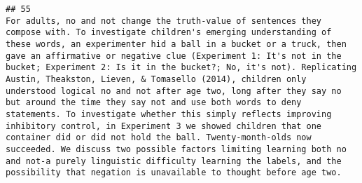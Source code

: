 \documentclass[
  english,
  man]{apa6}
\begin{document}
\begin{verbatim}
## 55                                                                                                                                                                                                                                                                                                                                                                                                                                                                                                                                                                                                                                                                                                                                                                                                                                                                                                                                                                                                                                                                                                                                                                                                                                                                                                                                                                                                                                                                                                                                                                                                                                                                                                               For adults, no and not change the truth-value of sentences they compose with. To investigate children's emerging understanding of these words, an experimenter hid a ball in a bucket or a truck, then gave an affirmative or negative clue (Experiment 1: It's not in the bucket; Experiment 2: Is it in the bucket?; No, it's not). Replicating Austin, Theakston, Lieven, & Tomasello (2014), children only understood logical no and not after age two, long after they say no but around the time they say not and use both words to deny statements. To investigate whether this simply reflects improving inhibitory control, in Experiment 3 we showed children that one container did or did not hold the ball. Twenty-month-olds now succeeded. We discuss two possible factors limiting learning both no and not-a purely linguistic difficulty learning the labels, and the possibility that negation is unavailable to thought before age two.

\end{verbatim}
\end{document}
